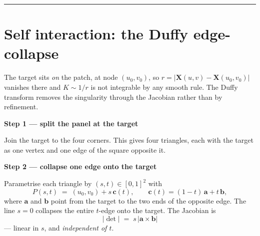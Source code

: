 \documentclass[11pt]{article}
\newcommand{\stepbox}[1]{%
  \par\medskip\noindent\textbf{\color{cElem}#1}\par\nopagebreak\smallskip}
\begin{document}
\vspace{1em}
\hrule
\section{Self interaction: the Duffy edge-collapse}

The target sits \emph{on} the patch, at node $(u_0,v_0)$, so $r=|\mathbf{X}(u,v)-\mathbf{X}(u_0,v_0)|$
vanishes there and $K\sim1/r$ is not integrable by any smooth rule. The Duffy transform removes
the singularity through the Jacobian rather than by refinement.

\stepbox{Step 1 --- split the panel at the target}

Join the target to the four corners. This gives four triangles, each with the target as one
vertex and one edge of the square opposite it.

\begin{center}
\begin{minipage}{\textwidth}\centering
{}
\end{minipage}
\end{center}

\stepbox{Step 2 --- collapse one edge onto the target}

Parametrise each triangle by $(s,t)\in[0,1]^2$ with
\[
  P(s,t) \;=\; (u_0,v_0) + s\,\mathbf{c}(t), \qquad \mathbf{c}(t) = (1-t)\,\mathbf{a} + t\,\mathbf{b},
\]
where $\mathbf{a}$ and $\mathbf{b}$ point from the target to the two ends of the opposite edge.
The line $s=0$ collapses the entire $t$-edge onto the target. The Jacobian is
\[
  \boxed{\;|\det| \;=\; s\,|\mathbf{a}\times\mathbf{b}|\;}
\]
--- linear in $s$, and \emph{independent of $t$}.
\end{document}
